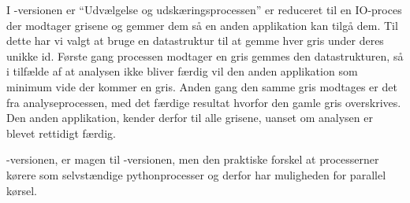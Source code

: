 I -versionen er ``Udvælgelse og udskæringsprocessen'' er reduceret til en IO-proces der modtager grisene og gemmer dem så en anden applikation kan tilgå dem. Til dette har vi valgt at bruge en  datastruktur til at gemme  hver gris under deres unikke id. Første gang processen modtager en gris gemmes den datastrukturen, så i tilfælde af at analysen ikke bliver færdig vil den anden applikation som minimum vide der kommer en gris. Anden gang den samme gris modtages er det fra analyseprocessen, med det færdige resultat hvorfor  den gamle gris overskrives. Den anden applikation, kender derfor til alle grisene, uanset om analysen er blevet rettidigt færdig.

-versionen, er magen til -versionen, men den praktiske forskel at processerner kørere som selvstændige pythonprocesser og derfor har muligheden for parallel kørsel. 




